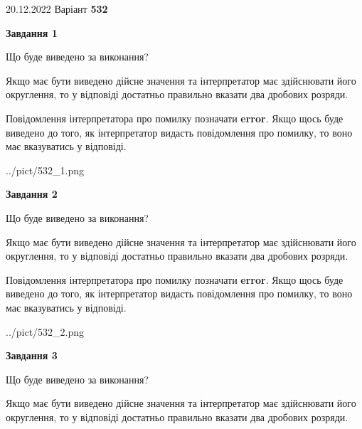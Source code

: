 \documentclass[12pt, ukrainian]{article}
\begin{document}
{20.12.2022 Варіант \No \textbf { 532 }\par}
{
\begin {Large}

{\begin {center}\textbf{Завдання 1}\end {center}}\par
Що буде виведено за виконання? \par

Якщо має бути виведено дійсне значення та інтерпретатор має здійснювати його округлення, 
то у відповіді достатньо правильно вказати два дробових розряди.

Повідомлення інтерпретатора про помилку позначати \textbf{error}.
Якщо щось буде виведено до того, як інтерпретатор видасть повідомлення про помилку, 
то воно має вказуватись у відповіді. \par

\begin{center}
	{../pict/532_1.png}
\end{center}
\newpage

{\begin {center}\textbf{Завдання 2}\end {center}}\par
Що буде виведено за виконання? \par

Якщо має бути виведено дійсне значення та інтерпретатор має здійснювати його округлення, 
то у відповіді достатньо правильно вказати два дробових розряди.

Повідомлення інтерпретатора про помилку позначати \textbf{error}.
Якщо щось буде виведено до того, як інтерпретатор видасть повідомлення про помилку, 
то воно має вказуватись у відповіді. \par

\begin{center}
	{../pict/532_2.png}
\end{center}
\newpage

{\begin {center}\textbf{Завдання 3}\end {center}}\par
Що буде виведено за виконання? \par

Якщо має бути виведено дійсне значення та інтерпретатор має здійснювати його округлення, 
то у відповіді достатньо правильно вказати два дробових розряди.


\end{Large}}
\end{document}
